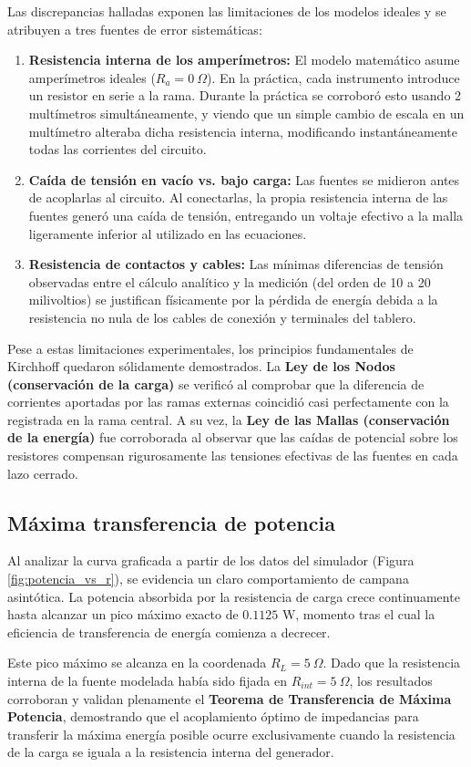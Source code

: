 \documentclass[11pt]{article}
\begin{document}
Las discrepancias halladas exponen las limitaciones de los modelos ideales y se atribuyen a tres fuentes de error sistemáticas:
\begin{enumerate}
    \item \textbf{Resistencia interna de los amperímetros:} El modelo matemático asume amperímetros ideales ($R_a = 0\ \Omega$). En la práctica, cada instrumento introduce un resistor en serie a la rama. Durante la práctica se corroboró esto usando 2 multímetros simultáneamente, y viendo que un simple cambio de escala en un multímetro alteraba dicha resistencia interna, modificando instantáneamente todas las corrientes del circuito.
    \item \textbf{Caída de tensión en vacío vs. bajo carga:} Las fuentes se midieron antes de acoplarlas al circuito. Al conectarlas, la propia resistencia interna de las fuentes generó una caída de tensión, entregando un voltaje efectivo a la malla ligeramente inferior al utilizado en las ecuaciones.
    \item \textbf{Resistencia de contactos y cables:} Las mínimas diferencias de tensión observadas entre el cálculo analítico y la medición (del orden de 10 a 20 milivoltios) se justifican físicamente por la pérdida de energía debida a la resistencia no nula de los cables de conexión y terminales del tablero.
\end{enumerate}

Pese a estas limitaciones experimentales, los principios fundamentales de Kirchhoff quedaron sólidamente demostrados. La \textbf{Ley de los Nodos (conservación de la carga)} se verificó al comprobar que la diferencia de corrientes aportadas por las ramas externas coincidió casi perfectamente con la registrada en la rama central. A su vez, la \textbf{Ley de las Mallas (conservación de la energía)} fue corroborada al observar que las caídas de potencial sobre los resistores compensan rigurosamente las tensiones efectivas de las fuentes en cada lazo cerrado.

\subsection{Máxima transferencia de potencia}
Al analizar la curva graficada a partir de los datos del simulador (Figura \ref{fig:potencia_vs_r}), se evidencia un claro comportamiento de campana asintótica. La potencia absorbida por la resistencia de carga crece continuamente hasta alcanzar un pico máximo exacto de $0.1125\text{ W}$, momento tras el cual la eficiencia de transferencia de energía comienza a decrecer. 

Este pico máximo se alcanza en la coordenada $R_L = 5\ \Omega$. Dado que la resistencia interna de la fuente modelada había sido fijada en $R_{int} = 5\ \Omega$, los resultados corroboran y validan plenamente el \textbf{Teorema de Transferencia de Máxima Potencia}, demostrando que el acoplamiento óptimo de impedancias para transferir la máxima energía posible ocurre exclusivamente cuando la resistencia de la carga se iguala a la resistencia interna del generador.
\end{document}
